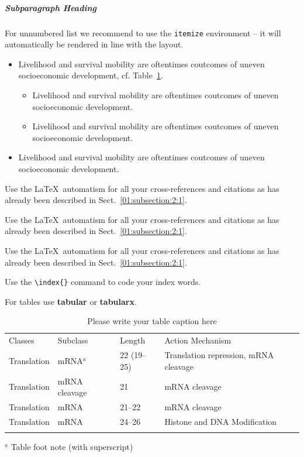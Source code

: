 \begin{bibunit}
\subparagraph{Subparagraph Heading}\label{01:subparagraph:1:1}

For unnumbered list we recommend to use the \verb|itemize| environment -- it will automatically be rendered in line with the layout.

\begin{itemize}
\item{Livelihood and survival mobility are oftentimes coutcomes of uneven socioeconomic development, cf. Table~\ref{01:tab:1}.}
\begin{itemize}
\item{Livelihood and survival mobility are oftentimes coutcomes of uneven socioeconomic development.}
\item{Livelihood and survival mobility are oftentimes coutcomes of uneven socioeconomic development.}
\end{itemize}
\item{Livelihood and survival mobility are oftentimes coutcomes of uneven socioeconomic development.}
\end{itemize}

 Use the \LaTeX\ automatism for all your cross-references and citations as has already been described in Sect.~\ref{01:subsection:2:1}.

 Use the \LaTeX\ automatism for all your cross-references and citations as has already been described in Sect.~\ref{01:subsection:2:1}.

 Use the \LaTeX\ automatism for all your cross-references and citations as has already been described in Sect.~\ref{01:subsection:2:1}.

Use the \verb|\index{}| command to code your index words.

For tables use \textbf{tabular} or \textbf{tabularx}.

\begin{table}[!t]
\caption{Please write your table caption here}
\label{01:tab:1} %
%
%
\begin{tabular}{p{2cm}p{2.4cm}p{2cm}p{4.9cm}}
\hline\noalign{\smallskip}
Classes & Subclass & Length & Action Mechanism  \\
\noalign{\smallskip}\svhline\noalign{\smallskip}
Translation & mRNA$^a$  & 22 (19--25) & Translation repression, mRNA cleavage\\
Translation & mRNA cleavage & 21 & mRNA cleavage\\
Translation & mRNA  & 21--22 & mRNA cleavage\\
Translation & mRNA  & 24--26 & Histone and DNA Modification\\
\noalign{\smallskip}\hline\noalign{\smallskip}
\end{tabular}
$^a$ Table foot note (with superscript)
\end{table}
%

\end{bibunit}
